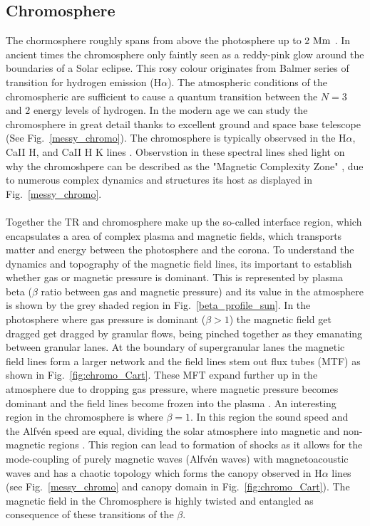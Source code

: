 \documentclass[12pt]{ociamthesis}
\newcommand{\Alfven}{Alfv\'{e}n }
\newcommand{\np}{\\ \\}
\begin{document}
\subsection{Chromosphere}
\label{ssec:Chromosphere}
The chormosphere roughly spans from above the photosphere up to $2~\rm{Mm}$ \citep{Lang_2006ses}. In ancient times the chromosphere only faintly seen as a reddy-pink glow around the boundaries of a Solar eclipse. This rosy colour originates from Balmer series of transition for hydrogen emission (H$\alpha$). The atmospheric conditions of the chromospheric are sufficient to cause a quantum transition between the $N=3$ and $2$ energy levels of hydrogen. In the modern age we can study the chromosphere in great detail thanks to excellent ground and space base telescope (See Fig.~\ref{messy_chromo}). The chromosphere is typically observsed in the H$\alpha$, CaII H, and CaII H K lines \citep{Ayres2019sgspbook27A}. Observstion in these spectral lines shed light on why the chromoshpere can be described as the "Magnetic Complexity Zone" \citep{Ayres2009astro2010S9A}, due to numerous complex dynamics and structures its host as displayed in Fig.~\ref{messy_chromo}. \np  
%
Together the TR and chromosphere make up the so-called interface region, which encapsulates a area of complex plasma and magnetic fields, which transports matter and energy between the photosphere and the corona. To understand the dynamics and topography of the magnetic field lines, its important to establish whether gas or magnetic pressure is dominant. This is represented by plasma beta ($\beta$ ratio between gas and magnetic pressure) and its value in the atmosphere is shown by the grey shaded region in Fig.~\ref{beta_profile_sun}. In the photosphere where gas pressure is dominant ($\beta>1$) the magnetic field get dragged get dragged by granular flows, being pinched together as they emanating between granular lanes. At the boundary of supergranular lanes the magnetic field lines form a larger network and the field lines stem out flux tubes (MTF) as shown in Fig.~\ref{fig:chromo_Cart}. These MFT expand further up in the atmosphere due to dropping gas pressure, where magnetic pressure becomes dominant and the field lines become frozen into the plasma \citep{Ayres2009astro2010S9A}. An interesting region in the chromosphere is where $\beta=1$. In this region the sound speed and the \Alfven speed are equal, dividing the solar atmosphere into magnetic and non-magnetic regions \citep{Tsiropoula2012}. This region can lead to formation of shocks as it allows for the mode-coupling of purely magnetic waves (\Alfven waves) with magnetoacoustic waves \citep{Hollweg1982SoPh7535H, Rosenthal2002ApJ564508R,Bogdan2003ApJ599626B, Cally2008SoPh251251C, Wang2020ApJ891110W} and has a chaotic topology which forms the canopy observed in H$\alpha$ lines (see Fig.~\ref{messy_chromo} and canopy domain in Fig.~\ref{fig:chromo_Cart}). The magnetic field in the Chromosphere is highly twisted and entangled as consequence of these transitions of the $\beta$. \np
\end{document}
